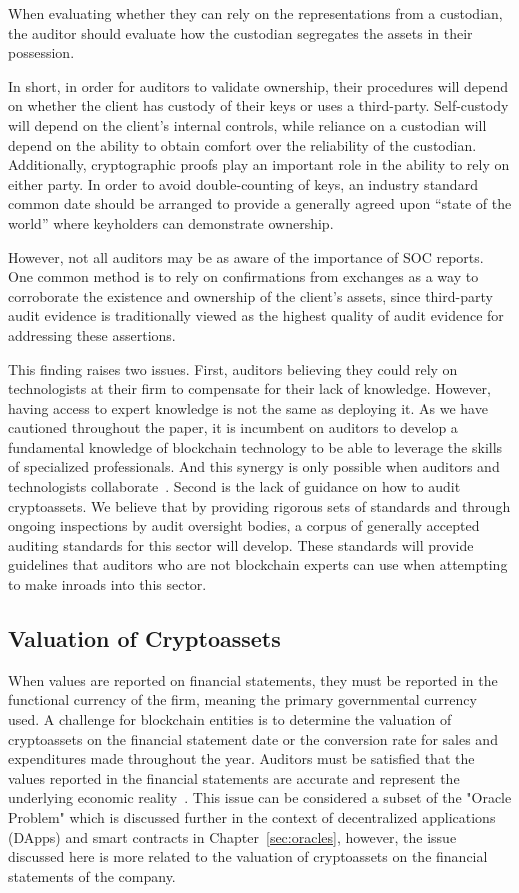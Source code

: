 When evaluating whether they can rely on the representations from a custodian, the auditor should evaluate how the custodian segregates the assets in their possession. 

In short, in order for auditors to validate ownership, their procedures will depend on whether the client has custody of their keys or uses a third-party. Self-custody will depend on the client's internal controls, while reliance on a custodian will depend on the ability to obtain comfort over the reliability of the custodian. Additionally, cryptographic proofs play an important role in the ability to rely on either party. In order to avoid double-counting of keys, an industry standard common date should be arranged to provide a generally agreed upon ``state of the world'' where keyholders can demonstrate ownership. 

However, not all auditors may be as aware of the importance of SOC reports. One common method is to rely on confirmations from exchanges as a way to corroborate the existence and ownership of the client's assets, since third-party audit evidence is traditionally viewed as the highest quality of audit evidence for addressing these assertions. 

This finding raises two issues. First, auditors believing they could rely on technologists at their firm to compensate for their lack of knowledge. However, having access to expert knowledge is not the same as deploying it. As we have cautioned throughout the paper, it is incumbent on auditors to develop a fundamental knowledge of blockchain technology to be able to leverage the skills of specialized professionals. And this synergy is only possible when auditors and technologists collaborate~\cite{bauer2019one}. Second is the lack of guidance on how to audit cryptoassets. We believe that by providing rigorous sets of standards and through ongoing inspections by audit oversight bodies, a corpus of generally accepted auditing standards for this sector will develop. These standards will provide guidelines that auditors who are not blockchain experts can use when attempting to make inroads into this sector. 



\subsection{Valuation of Cryptoassets} \label{sec:auditing:framework:valuation}
When values are reported on financial statements, they must be reported in the functional currency of the firm, meaning the primary governmental currency used. A challenge for blockchain entities is to determine the valuation of cryptoassets on the financial statement date or the conversion rate for sales and expenditures made throughout the year. Auditors must be satisfied that the values reported in the financial statements are accurate and represent the underlying economic reality~\cite{eyvaluation}. This issue can be considered a subset of the "Oracle Problem" which is discussed further in the context of decentralized applications (DApps) and smart contracts in Chapter~\ref{sec:oracles}, however, the issue discussed here is more related to the valuation of cryptoassets on the financial statements of the company.


